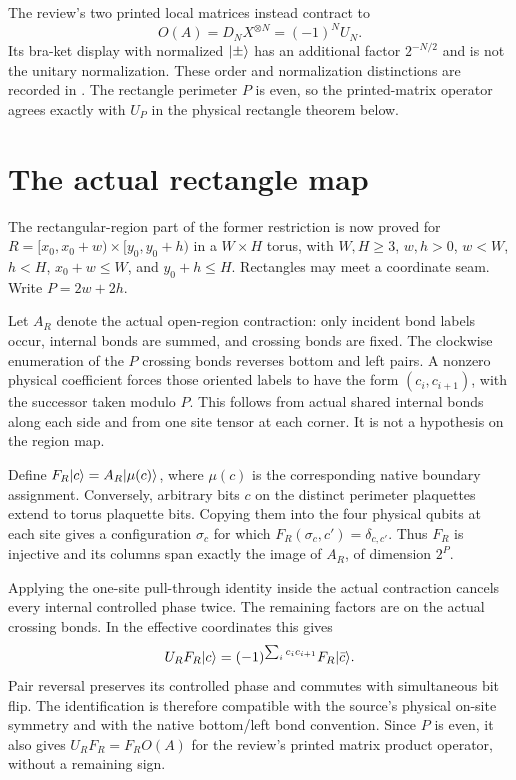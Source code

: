 \documentclass{article}
\begin{document}
The review's two printed local matrices instead contract to
\[
    O(A)=D_NX^{\otimes N}=(-1)^NU_N.
\]
Its bra-ket display with normalized
$|\pm\rangle$ has an additional factor $2^{-N/2}$ and is not the unitary
normalization. These order and normalization distinctions are recorded in
. The rectangle perimeter $P$ is
even, so the printed-matrix operator agrees exactly with $U_P$ in the
physical rectangle theorem below.

\section{The actual rectangle map}
The rectangular-region part of the former restriction is now proved for
$R=\lbrack x_0,x_0+w)\times\lbrack y_0,y_0+h)$ in a $W\times H$ torus, with
$W,H\geq3$, $w,h>0$, $w<W$, $h<H$, $x_0+w\leq W$, and
$y_0+h\leq H$. Rectangles may meet a coordinate seam. Write $P=2w+2h$.

Let $A_R$ denote the actual open-region contraction: only incident bond
labels occur, internal bonds are summed, and crossing bonds are fixed.
The clockwise enumeration of the $P$ crossing bonds reverses bottom and
left pairs. A nonzero physical coefficient forces those oriented labels
to have the form $(c_i,c_{i+1})$, with the successor taken modulo $P$.
This follows from actual shared internal bonds along each side and from
one site tensor at each corner. It is not a hypothesis on the region map.


Define $F_R|c\rangle=A_R|\mu(c)\rangle$, where $\mu(c)$ is the corresponding
native boundary assignment. Conversely, arbitrary bits $c$ on the distinct
perimeter plaquettes extend to torus plaquette bits. Copying them into the
four physical qubits at each site gives a configuration $\sigma_c$ for which
$F_R(\sigma_c,c')=\delta_{c,c'}$. Thus $F_R$ is injective and its columns
span exactly the image of $A_R$, of dimension $2^P$.


Applying the one-site pull-through identity inside the actual contraction
cancels every internal controlled phase twice. The remaining factors are
on the actual crossing bonds. In the effective coordinates this gives
\[
    U_RF_R|c\rangle=(-1)^{\sum_i c_ic_{i+1}}F_R|\bar c\rangle.
\]
Pair reversal preserves its controlled phase and commutes with simultaneous
bit flip. The identification is therefore compatible with the source's
physical on-site symmetry and with the native bottom/left bond convention.
Since $P$ is even, it also gives $U_RF_R=F_RO(A)$ for the review's printed
matrix product operator, without a remaining sign.
\end{document}
